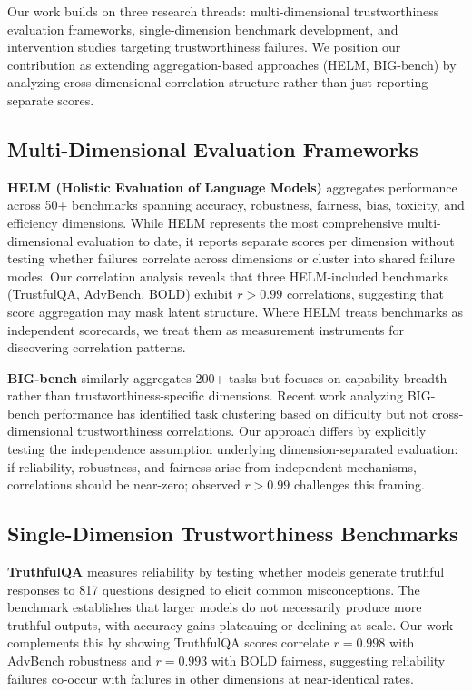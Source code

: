 Our work builds on three research threads: multi-dimensional trustworthiness evaluation frameworks, single-dimension benchmark development, and intervention studies targeting trustworthiness failures. We position our contribution as extending aggregation-based approaches (HELM, BIG-bench) by analyzing cross-dimensional correlation structure rather than just reporting separate scores.

\subsection{Multi-Dimensional Evaluation Frameworks}

\textbf{HELM (Holistic Evaluation of Language Models)} aggregates performance across 50+ benchmarks spanning accuracy, robustness, fairness, bias, toxicity, and efficiency dimensions. While HELM represents the most comprehensive multi-dimensional evaluation to date, it reports separate scores per dimension without testing whether failures correlate across dimensions or cluster into shared failure modes. Our correlation analysis reveals that three HELM-included benchmarks (TrustfulQA, AdvBench, BOLD) exhibit $r > 0.99$ correlations, suggesting that score aggregation may mask latent structure. Where HELM treats benchmarks as independent scorecards, we treat them as measurement instruments for discovering correlation patterns.

\textbf{BIG-bench} similarly aggregates 200+ tasks but focuses on capability breadth rather than trustworthiness-specific dimensions. Recent work analyzing BIG-bench performance has identified task clustering based on difficulty but not cross-dimensional trustworthiness correlations. Our approach differs by explicitly testing the independence assumption underlying dimension-separated evaluation: if reliability, robustness, and fairness arise from independent mechanisms, correlations should be near-zero; observed $r > 0.99$ challenges this framing.

\subsection{Single-Dimension Trustworthiness Benchmarks}

\textbf{TruthfulQA} measures reliability by testing whether models generate truthful responses to 817 questions designed to elicit common misconceptions. The benchmark establishes that larger models do not necessarily produce more truthful outputs, with accuracy gains plateauing or declining at scale. Our work complements this by showing TruthfulQA scores correlate $r = 0.998$ with AdvBench robustness and $r = 0.993$ with BOLD fairness, suggesting reliability failures co-occur with failures in other dimensions at near-identical rates.

